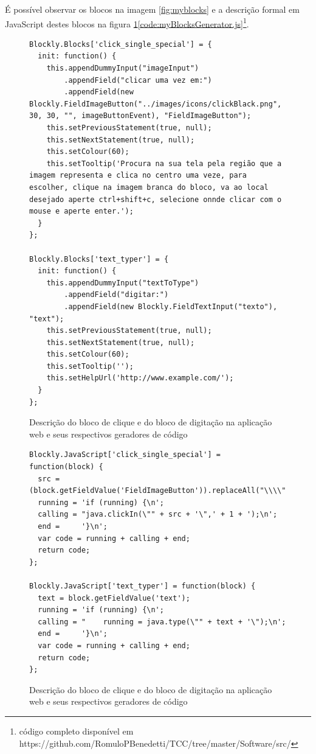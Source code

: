 \documentclass[tg]{mdtufsm}
\begin{document}
                    É possível observar os blocos na imagem \ref{fig:myblocks} e a descrição formal em JavaScript destes blocos na figura \ref{code:myBlocks.js}\ref{code:myBlocksGenerator.js}\footnote{código completo disponível em https://github.com/RomuloPBenedetti/TCC/tree/master/Software/src/}.


\begin{figure}[!htb]
\begin{lstlisting}
Blockly.Blocks['click_single_special'] = {
  init: function() {
    this.appendDummyInput("imageInput")
        .appendField("clicar uma vez em:")
        .appendField(new Blockly.FieldImageButton("../images/icons/clickBlack.png", 30, 30, "", imageButtonEvent), "FieldImageButton");
    this.setPreviousStatement(true, null);
    this.setNextStatement(true, null);
    this.setColour(60);
    this.setTooltip('Procura na sua tela pela região que a imagem representa e clica no centro uma veze, para escolher, clique na imagem branca do bloco, va ao local desejado aperte ctrl+shift+c, selecione onnde clicar com o mouse e aperte enter.');
  }
};

Blockly.Blocks['text_typer'] = {
  init: function() {
    this.appendDummyInput("textToType")
        .appendField("digitar:")
        .appendField(new Blockly.FieldTextInput("texto"), "text");
    this.setPreviousStatement(true, null);
    this.setNextStatement(true, null);
    this.setColour(60);
    this.setTooltip('');
    this.setHelpUrl('http://www.example.com/');
  }
};
\end{lstlisting}
    \caption{Descrição do bloco de clique e do bloco de digitação na aplicação web e seus respectivos geradores de código}
    \label{code:myBlocks.js}
\end{figure}

\begin{figure}[!htb]
\begin{lstlisting}
Blockly.JavaScript['click_single_special'] = function(block) {
  src = (block.getFieldValue('FieldImageButton')).replaceAll("\\\\","\\\\");
  running = 'if (running) {\n';
  calling = "java.clickIn(\"" + src + '\",' + 1 + ');\n';
  end =     '}\n';
  var code = running + calling + end;
  return code;
};

Blockly.JavaScript['text_typer'] = function(block) {
  text = block.getFieldValue('text');
  running = 'if (running) {\n';
  calling = "    running = java.type(\"" + text + '\");\n';
  end =     '}\n';
  var code = running + calling + end;
  return code;
};
\end{lstlisting}
    \caption{Descrição do bloco de clique e do bloco de digitação na aplicação web e seus respectivos geradores de código}
    \label{code:myBlocks2.js}
\end{figure}
\end{document}

